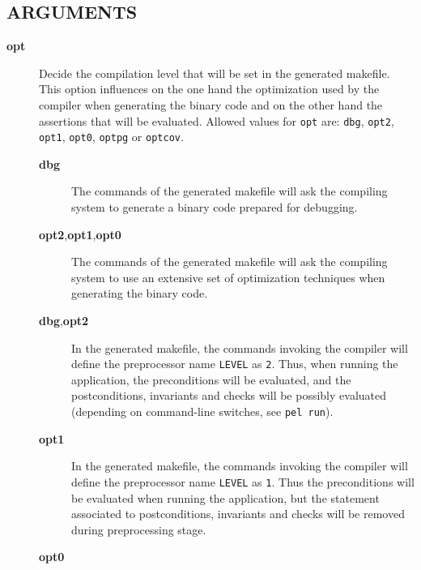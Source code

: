 \documentclass{article}
\begin{document}
\subsection*{ARGUMENTS\label{depend_ARGUMENTS}}
\begin{description}

\item[\textbf{opt}] \mbox{}

Decide the compilation level that will be set in the
generated makefile. This option influences on the one
hand the optimization used by the compiler when generating
the binary code and on the other hand the assertions that
will be evaluated. Allowed values for \texttt{opt}
are: \texttt{dbg}, \texttt{opt2}, \texttt{opt1}, \texttt{opt0}, \texttt{optpg} or \texttt{optcov}.

\begin{description}

\item[\textbf{dbg}] \mbox{}

The commands of the generated makefile will ask the compiling system
to generate a binary code prepared for debugging.


\item[\textbf{opt2},\textbf{opt1},\textbf{opt0}] \mbox{}

The commands of the generated makefile will ask the compiling system
to use an extensive set of optimization techniques
when generating the binary code.


\item[\textbf{dbg},\textbf{opt2}] \mbox{}

In the generated makefile, the commands invoking the compiler
will define the preprocessor name \texttt{LEVEL} as \texttt{2}. Thus,
when running the application,
the preconditions will be evaluated, and the postconditions, invariants
and checks will be possibly evaluated (depending on command-line switches,
see \texttt{pel run}).


\item[\textbf{opt1}] \mbox{}

In the generated makefile, the commands invoking the compiler
will define the preprocessor name \texttt{LEVEL} as \texttt{1}. Thus
the preconditions will be evaluated when running the application,
but the statement associated to
postconditions, invariants and checks will be removed during
preprocessing stage.


\item[\textbf{opt0}] \mbox{}


\end{description}
\end{description}
\end{document}
